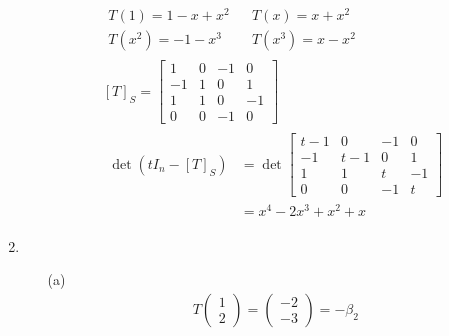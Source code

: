 \documentclass[12pt]{article}
\begin{document}
\begin{enumerate}
\begin{enumerate}
\begin{gather*}
\begin{aligned}
                                    T(1)=1-x+x^2             &  & T(x)=x+x^2              \\
                                    T\left(x^2\right)=-1-x^3 &  & T\left(x^3\right)=x-x^2
                              \end{aligned} \\
                              [T]_S=\begin{bmatrix}
                                    1  & 0 & -1 & 0  \\
                                    -1 & 1 & 0  & 1  \\
                                    1  & 1 & 0  & -1 \\
                                    0  & 0 & -1 & 0
                              \end{bmatrix} \\
                              \begin{aligned}
                                    \det \left(tI_n-[T]_S\right) & = \det \begin{bmatrix}
                                                                                t-1 & 0   & -1 & 0  \\
                                                                                -1  & t-1 & 0  & 1  \\
                                                                                1   & 1   & t  & -1 \\
                                                                                0   & 0   & -1 & t
                                                                          \end{bmatrix} \\
                                                                 & = \boxed{x^4-2x^3+x^2+x}
                              \end{aligned}
                        \end{gather*}
            \end{enumerate}
      \item \begin{enumerate}
                  \item[(a)] \begin{gather*}
                              T\begin{pmatrix}1 \\ 2\end{pmatrix}=\begin{pmatrix}-2 \\ -3\end{pmatrix}=-\beta_2 \\

\end{gather*}
\end{enumerate}
\end{enumerate}
\end{document}
